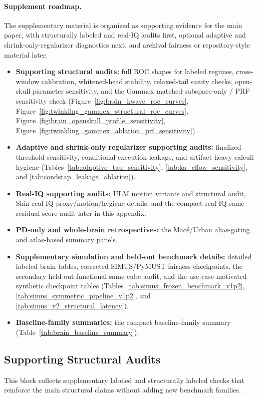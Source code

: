 \paragraph{Supplement roadmap.}
\noindent The supplementary material is organized as supporting evidence for the main paper, with structurally labeled and real-IQ audits first, optional adaptive and shrink-only-regularizer diagnostics next, and archival fairness or repository-style material later.
\begin{itemize}[nosep]
  \item \textbf{Supporting structural audits:} full ROC shapes for labeled regimes, cross-window calibration, whitened-head stability, relaxed-tail sanity checks, open-skull parameter sensitivity, and the Gammex matched-subspace-only / PRF sensitivity check (Figure~\ref{fig:brain_kwave_roc_curves}, Figure~\ref{fig:twinkling_gammex_structural_roc_curves}, Figure~\ref{fig:brain_openskull_profile_sensitivity}, Figure~\ref{fig:twinkling_gammex_ablation_prf_sensitivity}).
  \item \textbf{Adaptive and shrink-only regularizer supporting audits:} finalized threshold sensitivity, conditional-execution leakage, and artifact-heavy calculi hygiene (Tables~\ref{tab:adaptive_tau_sensitivity}, \ref{tab:ka_cflow_sensitivity}, and \ref{tab:condstap_leakage_ablation}).
  \item \textbf{Real-IQ supporting audits:} ULM motion variants and structural audit, Shin real-IQ proxy/motion/hygiene details, and the compact real-IQ same-residual score audit later in this appendix.
  \item \textbf{PD-only and whole-brain retrospectives:} the Mac{\'e}/Urban alias-gating and atlas-based summary panels.
  \item \textbf{Supplementary simulation and held-out benchmark details:} detailed labeled brain tables, corrected SIMUS/PyMUST fairness checkpoints, the secondary held-out functional same-cube audit, and the use-case-motivated synthetic checkpoint tables (Tables~\ref{tab:simus_frozen_benchmark_v1p2}, \ref{tab:simus_symmetric_pipeline_v1p2}, and \ref{tab:simus_v2_structural_latency}).
  \item \textbf{Baseline-family summaries:} the compact baseline-family summary (Table~\ref{tab:brain_baseline_summary}).
\end{itemize}

\subsection*{Supporting Structural Audits}
This block collects supplementary labeled and structurally labeled checks that reinforce the main structural claims without adding new benchmark families.

